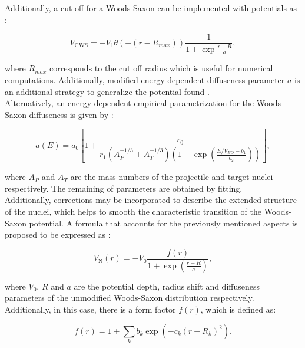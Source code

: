 \documentclass[openany]{book}
\begin{document}
Additionally, a cut off for a Woods-Saxon can be implemented with potentials as \cite{kabir_irgaziev_nabi_sagheer_2022}:

\begin{equation}\label{eq:potential_woodsSaxon_cutOFF}
	V_{\mathrm{CWS}} = - V_1 \theta(- (r- R_{max})) \frac{1}{1 + \exp {\frac{r - R}{a}}},
\end{equation}

where $R_{max}$ corresponds to the cut off radius which is useful for  numerical computations. Additionally,  modified energy dependent diffuseness parameter $a$ is an additional strategy to generalize the potential found \cite{singh_sukhvinder_kharab_2013A}. \\

Alternatively, an energy dependent empirical parametrization for the Woods-Saxon diffuseness is given by \cite{singh_sukhvinder_kharab_2013A, singh_sukhvinder_kharab_2013B}:

\begin{equation}\label{eq:potential_WoodsSaxon_a_energyDependet}
	a(E) = a_0 \left[1 + \frac{r_0}{r_1(A_P^{-1/3} + A_T^{-1/3} ) (1 + \exp (\frac{E/V_{BO} - b_1}{b_2}))}\right],
\end{equation}

where $A_P$ and $A_T$ are the mass numbers of the projectile and target nuclei respectively. The remaining of parameters are obtained by fitting. \\

Additionally, corrections may be incorporated to describe the extended structure of the nuclei, which helps to smooth the characteristic transition of the Woods-Saxon potential. A formula that accounts for the previously mentioned aspects is proposed to be expressed as \cite{kabir_irgaziev_nabi_sagheer_2022}: 

\begin{equation}\label{eq:micro_doubleFolding_potential_N}
	V_{\mathrm{N}}(r) = - V_0 \frac{f(r)}{1 + \exp {\left( \frac{r - R}{a}\right)}},
\end{equation}

where $V_0$, $R$ and $a$ are the potential depth,  radius shift and diffuseness parameters of the unmodified Woods-Saxon distribution respectively. Additionally, in this case, there is a form factor $f(r)$, which is defined as: 

\begin{equation}\label{eq:micro_doubleFolding_potential_formFactor}
	f(r) =  1+ \sum_k{ b_k \exp ( {-c_k(r - R_k)^2}) }.
\end{equation} 
\end{document}

